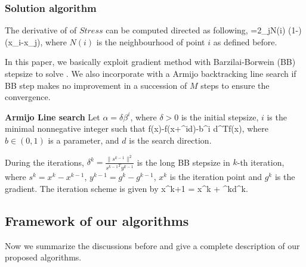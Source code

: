 \documentclass[a4paper,12pt]{article}
\begin{document}
\subsubsection{Solution algorithm}
The derivative of of $Stress$ can be computed directed as following,
\be {}=2\sum_{j\in N(i)} \Big(1-\Big)(x_i-x_j), \label{gradient}\ee
where $N(i)$ is the neighbourhood of point $i$ as defined before.

In this paper, we basically exploit gradient method with Barzilai-Borwein (BB) stepsize \cite{BB1988} to solve . We also incorporate with a Armijo backtracking line search \cite{Armijo1966,Sun2006} if BB step makes no improvement in a succession of $M$ steps to ensure the convergence.

\textbf{Armijo Line search} Let $\alpha = \delta\beta^i$, where $\delta>0$ is the initial stepsize, $i$ is the minimal nonnegative integer such that
\be f(x)-f(x+\delta\beta^id)\geq -b\delta\beta^i d^T\nabla f(x), \ee
where $b\in (0,1)$ is a parameter, and $d$ is the search direction.

During the iterations, $\delta^k=\frac{\|s^{k-1}\|^2}{{s^{k-1}}^Ty^{k-1}}$ is the long BB stepsize in $k$-th iteration, where $s^k=x^k-x^{k-1}$, $y^{k-1}=g^k-g^{k-1}$, $x^k$ is the iteration point and $g^k$ is the gradient. The iteration scheme is given by
\be x^{k+1} = x^k + \alpha^kd^k.\ee


\subsection{Framework of our algorithms}
Now we summarize the discussions before and give a complete description of our proposed algorithms.
%
%
\end{document}
